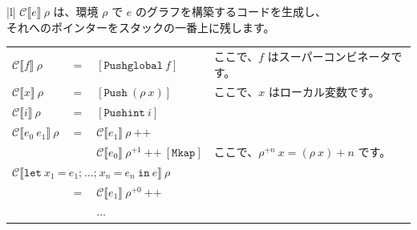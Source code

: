 \documentclass{jbook}
\begin{document}
\begin{tabular} {|l|} \hline
	$\mathcal{C} \llbracket e \rrbracket ~ \rho$ は、環境 $\rho$ で $e$ のグラフを構築するコードを生成し、 \\
	それへのポインターをスタックの一番上に残します。                                                       \\
	\begin{tabular}{l c l l}
		$\mathcal{C} \llbracket f \rrbracket ~ \rho$         & $=$ & $\left[\texttt{Pushglobal} ~ f \right]$                                                         & ここで、$f$ はスーパーコンビネータです。                                                             \\
		$\mathcal{C} \llbracket x \rrbracket ~ \rho$         & $=$ & $\left[\texttt{Push} ~ (\rho ~ x) \right]$                                                      & ここで、$x$ はローカル変数です。                                                                     \\
		$\mathcal{C} \llbracket i \rrbracket ~ \rho$         & $=$ & $\left[\texttt{Pushint} ~ i \right]$                                                            &                                                                                                      \\
		$\mathcal{C} \llbracket e_0 ~ e_1 \rrbracket ~ \rho$ & $=$ & $\mathcal{C} \llbracket e_1 \rrbracket ~ \rho ~ \texttt{++}$                                    &                                                                                                      \\
		                                                     &     & $\mathcal{C} \llbracket e_0 \rrbracket ~ \rho^{+1} ~ \texttt{++} ~ \left[\texttt{Mkap} \right]$ & ここで、$\rho^{+n} ~ x = (\rho ~ x) + n$ です。                                                      \\
		\multicolumn{4}{l}{$\mathcal{C} \llbracket \texttt{let} ~ x_1 ~ \texttt{=} ~ e_1\texttt{;} ~  \ldots \texttt{;} ~ x_n ~ \texttt{=} ~ e_n ~ \texttt{in} ~ e \rrbracket ~ \rho$}                                                                                      \\
		                                                     & $=$ & $\mathcal{C} \llbracket e_1 \rrbracket ~ \rho^{+0} ~ \texttt{++}$                               &                                                                                                      \\
		                                                     &     & $\ldots$                                                                                        &                                                                                                      \\

\end{tabular}
\end{tabular}
\end{document}
